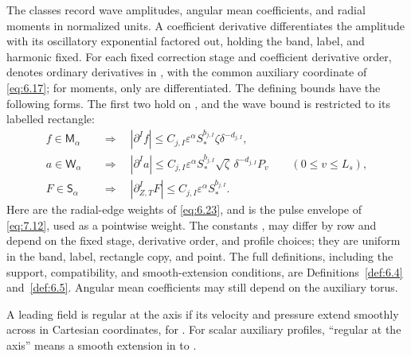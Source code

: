 The classes  record wave amplitudes, angular mean coefficients, and radial
moments in normalized units. A coefficient derivative differentiates the amplitude with
its oscillatory exponential factored out, holding the band, label, and harmonic fixed. For
each fixed correction stage and coefficient derivative order,
 denotes ordinary derivatives
in , with  the common auxiliary coordinate of \eqref{eq:6.17}; for moments, only
 are differentiated. The defining bounds have the following forms. The first two hold on
, and the wave bound is restricted to its labelled rectangle:
\[
\begin{aligned}
f\in \mathsf M_\alpha
&\quad\Longrightarrow\quad
|\partial^If|\leq C_{j,I}\varepsilon^\alpha S_*^{b_{j,I}}\zeta\delta^{-d_{j,I}},\\
a\in \mathsf W_\alpha
&\quad\Longrightarrow\quad
|\partial^Ia|\leq C_{j,I}\varepsilon^\alpha S_*^{b_{j,I}}\sqrt\zeta\,\delta^{-d_{j,I}}P_v
\qquad(0\leq v\leq L_s),\\
F\in \mathsf S_\alpha
&\quad\Longrightarrow\quad
|\partial_{Z,T}^IF|\leq C_{j,I}\varepsilon^\alpha S_*^{b_{j,I}}.
\end{aligned}
\]
Here  are the radial-edge weights of \eqref{eq:6.23}, and
 is the pulse envelope of \eqref{eq:7.12}, used
as a pointwise weight. The constants ,
 may differ by row and depend
on the fixed stage, derivative order, and profile choices; they are uniform in the band, label,
rectangle copy, and point. The full definitions, including the support, compatibility, and
smooth-extension conditions, are Definitions~\ref{def:6.4} and~\ref{def:6.5}. Angular mean coefficients may still
depend on the auxiliary torus.

\begin{definition}\label{def:3.2}
A leading field is regular at the axis if its velocity
and pressure extend smoothly across  in Cartesian coordinates, for
. For scalar
auxiliary profiles, ``regular at the axis'' means a smooth extension in
 to .
\end{definition}


